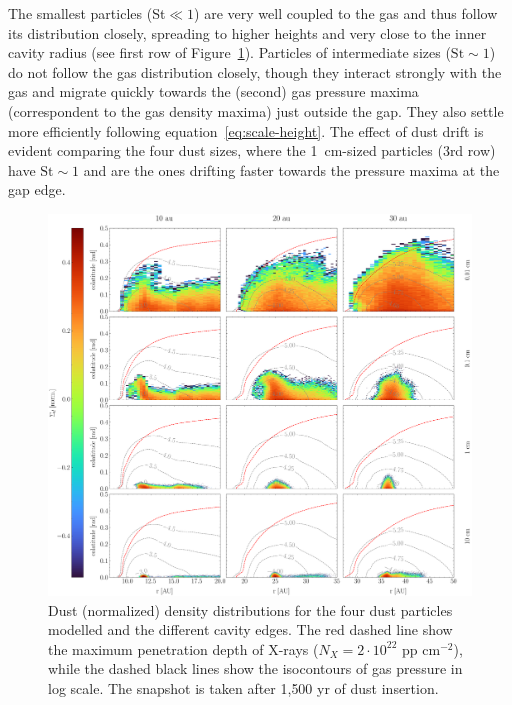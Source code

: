 \documentclass[fleqn,usenatbib]{mnras}
\begin{document}
        The smallest particles (St$\ll 1$) are very well coupled to the gas and thus follow its distribution closely, spreading to higher heights and very close to the inner cavity radius (see first row of Figure~\ref{fig:GasDustDist}).
        Particles of intermediate sizes ($\mathrm{St} \sim 1$) do not follow the gas distribution closely, though they interact strongly with the gas and migrate quickly towards the (second) gas pressure maxima (correspondent to the gas density maxima) just outside the gap.
        They also settle more efficiently following equation~\ref{eq:scale-height}.
        The effect of dust drift is evident comparing the four dust sizes, where the \SI{1}{cm}-sized particles (3rd row) have $\mathrm{St} \sim 1$ and are the ones drifting faster towards the pressure maxima at the gap edge.
        \begin{figure}
            \centering
            \includegraphics[width=\textwidth]{Fig3}
            \caption{Dust (normalized) density distributions for the four dust particles modelled and the different cavity edges. The red dashed line show the maximum penetration depth of X-rays ($N_X = 2\cdot 10^{22}$ pp cm$^{-2}$), while the dashed black lines show the isocontours of gas pressure in log scale. The snapshot is taken after 1,500 yr of dust insertion.}
            \label{fig:GasDustDist}
        \end{figure}
        
\end{document}
